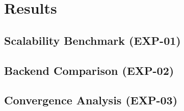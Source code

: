\chapter{Results}
\label{chap:results}


\section{Scalability Benchmark (EXP-01)}
\label{sec:results_scalability}



\section{Backend Comparison (EXP-02)}
\label{sec:results_backend}


\section{Convergence Analysis (EXP-03)}
\label{sec:results_convergence}

